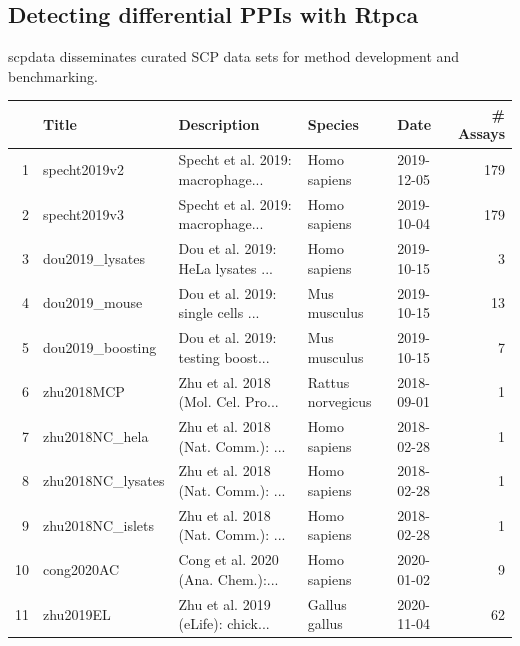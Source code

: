 \documentclass{article}
\newcommand{\hcode}[2][lgray]{{\ttfamily\color{vdgray}\colorbox{#1}{#2}}}
\begin{document}
\begin{multicols}{2}
\begin{minipage}[t]{\linewidth}
  \section*{\huge Detecting differential PPIs with \hcode{Rtpca}}
  
  \hcode{scpdata} disseminates curated SCP data sets for method 
  development and benchmarking.
  \vspace{0.1cm}
  
    \centering
    \scriptsize
    \begin{tabular}{rllllr}
      \hline
     & Title & Description & Species & Date & \# Assays \\ 
      \hline
    1 & specht2019v2 & Specht et al. 2019: macrophage... & Homo sapiens & 2019-12-05 & 179 \\ 
      2 & specht2019v3 & Specht et al. 2019: macrophage... & Homo sapiens & 2019-10-04 & 179 \\ 
      3 & dou2019\_lysates & Dou et al. 2019: HeLa lysates
    ... & Homo sapiens & 2019-10-15 &   3 \\ 
      4 & dou2019\_mouse & Dou et al. 2019: single cells ... & Mus musculus & 2019-10-15 &  13 \\ 
      5 & dou2019\_boosting & Dou et al. 2019: testing boost... & Mus musculus & 2019-10-15 &   7 \\ 
      6 & zhu2018MCP & Zhu et al. 2018 (Mol. Cel. Pro... & Rattus norvegicus & 2018-09-01 &   1 \\ 
      7 & zhu2018NC\_hela & Zhu et al. 2018 (Nat. Comm.): ... & Homo sapiens & 2018-02-28 &   1 \\ 
      8 & zhu2018NC\_lysates & Zhu et al. 2018 (Nat. Comm.): ... & Homo sapiens & 2018-02-28 &   1 \\ 
      9 & zhu2018NC\_islets & Zhu et al. 2018 (Nat. Comm.): ... & Homo sapiens & 2018-02-28 &   1 \\ 
      10 & cong2020AC & Cong et al. 2020 (Ana. Chem.):... & Homo sapiens & 2020-01-02 &   9 \\ 
      11 & zhu2019EL & Zhu et al. 2019 (eLife): chick... & Gallus gallus & 2020-11-04 &  62 \\ 
       \hline
    \end{tabular}
\end{minipage}


\noindent
\begin{minipage}[t]{\linewidth}
  \vspace{0.5cm}

\end{minipage}
\end{multicols}
\end{document}

